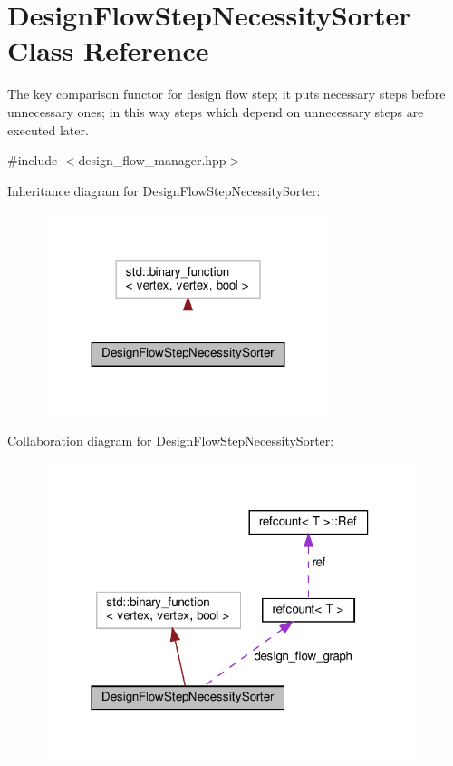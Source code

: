 \hypertarget{classDesignFlowStepNecessitySorter}{}\section{Design\+Flow\+Step\+Necessity\+Sorter Class Reference}
\label{classDesignFlowStepNecessitySorter}


The key comparison functor for design flow step; it puts necessary steps before unnecessary ones; in this way steps which depend on unnecessary steps are executed later.  




{\ttfamily \#include $<$design\+\_\+flow\+\_\+manager.\+hpp$>$}



Inheritance diagram for Design\+Flow\+Step\+Necessity\+Sorter\+:
\nopagebreak
\begin{figure}[H]
\begin{center}
\leavevmode
\includegraphics[width=239pt]{df/df6/classDesignFlowStepNecessitySorter__inherit__graph}
\end{center}
\end{figure}


Collaboration diagram for Design\+Flow\+Step\+Necessity\+Sorter\+:
\nopagebreak
\begin{figure}[H]
\begin{center}
\leavevmode
\includegraphics[width=309pt]{d9/d3e/classDesignFlowStepNecessitySorter__coll__graph}
\end{center}
\end{figure}
